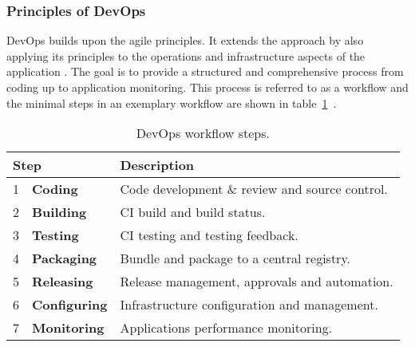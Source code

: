 \documentclass[12pt, a4paper]{article}
\begin{document}
        \subsubsection{Principles of DevOps}\label{ssec::devops_princibles}
        DevOps builds upon the agile principles. It extends the  approach by also applying its principles to the operations and infrastructure aspects of the application \cite{effective_devops}. The goal is to provide a structured and comprehensive process from coding up to application monitoring. This process is referred to as a workflow and the minimal steps in an exemplary workflow are shown in table~\ref{tab::devops_steps}~\cite{base_devops}.\newline

        \begin{table}[!h]
            \centering
            \begin{tabularx}{0.85\textwidth}{llX}
                \multicolumn{2}{l}{Step} & Description \\ \hline\hline
                1 & \textbf{Coding}& Code development \& review and source control.  \\
                2 & \textbf{Building}& \acs{CI} build and build status.  \\
                3 & \textbf{Testing}& \acs{CI} testing and testing feedback.  \\
                4 & \textbf{Packaging}& Bundle and package to a central registry.  \\
                5 & \textbf{Releasing}& Release management, approvals and automation.  \\
                6 & \textbf{Configuring}& Infrastructure configuration and management.  \\
                7 & \textbf{Monitoring}& Applications performance monitoring.  \\
            \end{tabularx}
            \caption{DevOps workflow steps.}
            \label{tab::devops_steps}
        \end{table}
\end{document}
